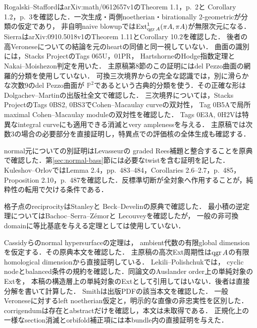\documentclass[11pt,a4paper]{ltjsarticle}
\begin{document}
\begin{description}[style=nextline]
Rogalski--Stafford\cite{RSsurface}はarXiv:math/0612657v1のTheorem 1.1，p.~2と
Corollary 1.2，p.~3を確認した．一次生成・両側noetherian・birationally 2-geometricが分類の仮定であり，
非自明naive blowupでは$\operatorname{Ext}^1_{\operatorname{qgr} A}(\pi A,\pi A)$が無限次元になる．
Sierra\cite{SierraSurface}はarXiv:0910.5018v1のTheorem 1.11とCorollary 10.2を確認した．
後者の高Veroneseについての結論を元のheartの同値と同一視していない．
曲面の識別には，Stacks Project\cite{Stacks}のTags 065U，01PR，
Hartshorne\cite[V, Theorems 1.9, 1.10]{Hartshorne}のHodge指数定理とNakai--Moishezon判定を用いた．
主原稿第8節のこの証明にはdel Pezzo曲面の網羅的分類を使用していない．
可換三次境界からの完全な認識では，別に滑らかな次数$9$のdel Pezzo曲面が
$\mathbb P^2$であるという古典的分類を使う．その正確な形は
Dolgachev--Martin\cite[\S2.1, \S3.1.1]{DolgachevMartin}の出版社全文で確認した．
三次境界については，Stacks Project\cite{Stacks}のTags 0BS2, 0BS3でCohen--Macaulay curveの双対性，
Tag 0B5Aで局所maximal Cohen--Macaulay moduleの双対性を確認した．
Tags 0E3A, 0H2Vは特異なintegral curveにも適用できる消滅とvery amplenessを与える．
主原稿では次数3の場合の必要部分を直接証明し，特異点での評価核の全体生成も確認する．

normal元についての別証明はLevasseur\cite[Proposition 3.4(b), p.~282]{LevasseurNormal}の
graded Rees補題と整合することを原典で確認した．第\ref{sec:normal-bass}節には必要なtwistを含む証明を記した．
Kuleshov--Orlov\cite{KO}ではLemma 2.4，pp.~483--484，Corollaries 2.6--2.7，p.~485，
Proposition 2.10，p.~487を確認した．反標準切断が全対象へ作用することが，純粋性の転用で欠ける条件である．

格子点のreciprocityはStanley\cite[\S6, Proposition 6.1, p.~208]{StanleyReciprocity}と
Beck--Develin\cite[\S4, Theorem 5, p.~8]{BeckDevelin}の原典で確認した．
最小積の逆定理についてはBachoc--Serra--Z\'emor\cite[Theorem 33, pp.~25--26]{BSZVosper}と
Lecouvey\cite[Theorem 5.8, pp.~20--21]{LecouveyDimension}を確認したが，
一般の非可換domainに等比基底を与える定理としては使用していない．

\item[高次Ext周期性・stack型境界・Veroneseの確認範囲]
Cassidyら\cite[Theorem 4.2, p.~150]{CCKM}のnormal hypersurfaceの定理は，
ambient代数の有限global dimensionを仮定する．その原典本文を確認した．
主原稿の高次Ext周期性は$\operatorname{qgr} A$の有限homological dimensionから直接証明している．
Lekili--Polishchuk\cite[Introduction, 著者版p.~3]{LPstack}では，
cyclic nodeとbalanced条件の規約を確認した．同論文のAuslander order上の単純対象のExtを，
本稿の構造層上の単純対象のExtとして引用してはいない．後者は直接分解を書いて計算した．
Smith\cite[Theorem 4.1, Example 4.6, Proposition 4.8]{SmithMaps}は出版PDFの該当本文を確認した．
一般Veroneseに対するleft noetherian仮定と，明示的な直像の非忠実性を区別した．
corrigendum\cite{SmithCorr}は存在とabstractだけを確認し，本文は未取得である．
正規化上の一様なsection消滅とorbifold補正項には本bundle内の直接証明を与えた．


\end{description}
\end{document}
